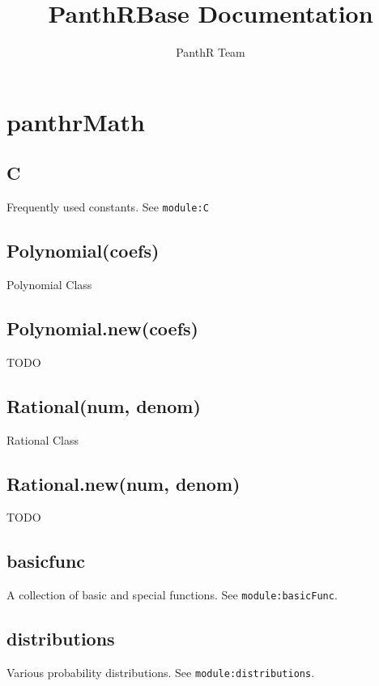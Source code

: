 \documentclass{article}
\title{PanthRBase Documentation}
\author{PanthR Team}
\begin{document}
\maketitle

\tableofcontents

  \section{panthrMath}
    \subsection*{C}
    Frequently used constants.  See \texttt{module:C}


    \subsection*{Polynomial(coefs)}
    Polynomial Class


    \subsection*{Polynomial.new(coefs)}
    TODO


    \subsection*{Rational(num, denom)}
    Rational Class


    \subsection*{Rational.new(num, denom)}
    TODO


    \subsection*{basicfunc}
    A collection of basic and special functions. See \texttt{module:basicFunc}.


    \subsection*{distributions}
    Various probability distributions. See \texttt{module:distributions}.
\end{document}
